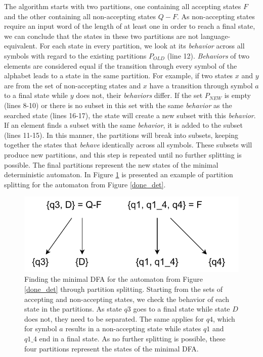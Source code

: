 The algorithm starts with two partitions, one containing all accepting states $F$ and the other containing all non-accepting states $Q-F$. As non-accepting states require an input word of the length of at least one in order to reach a final state, we can conclude that the states in these two partitions are not language-equivalent. For each state in every partition, we look at its \textit{behavior} across all symbols with regard to the existing partitions $P_{OLD}$ (line 12). \textit{Behaviors} of two elements are considered equal if the transition through every symbol of the alphabet leads to a state in the same partition. For example, if two states $x$ and $y$ are from the set of non-accepting states and $x$ have a transition through symbol $a$ to a final state while $y$ does not, their \textit{behaviors} differ. If the set $P_{NEW}$ is empty (lines 8-10) or there is no subset in this set with the same \textit{behavior} as the searched state (lines 16-17), the state will create a new subset with this \textit{behavior}. If an element finds a subset with the same \textit{behavior}, it is added to the subset (lines 11-15). In this manner, the partitions will break into subsets, keeping together the states that \textit{behave} identically across all symbols. These subsets will produce new partitions, and this step is repeated until no further splitting is possible. The final partitions represent the new states of the minimal deterministic automaton. In Figure \ref{part_tree} is presented an example of partition splitting for the automaton from Figure \ref{done_det}. 

\begin{figure}[ht]
    \label{part_tree}
    \centering
    \includegraphics[width=0.55\linewidth]{obrazky-figures/partition_tree.drawio.pdf}
    \caption{Finding the minimal DFA for the automaton from Figure \ref{done_det} through partition splitting. Starting from the sets of accepting and non-accepting states, we check the behavior of each state in the partitions. As state $q3$ goes to a final state while state $D$ does not, they need to be separated. The same applies for $q4$, which for symbol $a$ results in a non-accepting state while states $q1$ and $q1\_4$ end in a final state. As no further splitting is possible, these four partitions represent the states of the minimal DFA.}
\end{figure}
\vspace{0.3cm}

